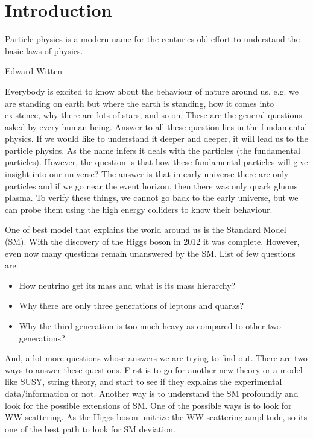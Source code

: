 \chapter{Introduction}

\epigraph{Particle physics is a modern name for the centuries old effort to understand
the basic laws of physics.}{Edward Witten}

Everybody is excited to know about the behaviour of nature around us, e.g. we are standing on earth but where the earth is standing, how it comes into existence, why there are lots of stars, and so on. These are the general questions asked by every human being. Answer to all these question lies in the fundamental physics. If we would like to understand it deeper and deeper, it will lead us to the particle physics. As the name infers it deals with the particles (the fundamental particles). However, the question is that how these fundamental particles will give insight into our universe? The answer is that in early universe there are only particles and if we go near the event horizon, then there was only quark gluons plasma. To verify these things, we cannot go back to the early universe, but we can probe them using the high energy colliders to know their behaviour.

One of best model that explains the world around us is the Standard Model (SM). With the discovery of the Higgs boson \cite{Chatrchyan:2012xdj} in 2012 it was complete. However, even now many questions remain unanswered by the SM. List of few questions are:

\begin{itemize}
\item How neutrino get its mass and what is its mass hierarchy? 
\item Why there are only three generations of leptons and quarks? 
\item Why the third generation is too much heavy as compared to other two generations?
\end{itemize}

And, a lot more questions whose answers we are trying to find out. There are two ways to answer these questions. First is to go for another new theory or a model like SUSY, string theory, and start to see if they explains the experimental data/information or not. Another way is to understand the SM profoundly and look for the possible extensions of SM. One of the possible ways is to look for WW scattering. As the Higgs boson unitrize the WW scattering amplitude, so its one of the best path to look for SM deviation.

